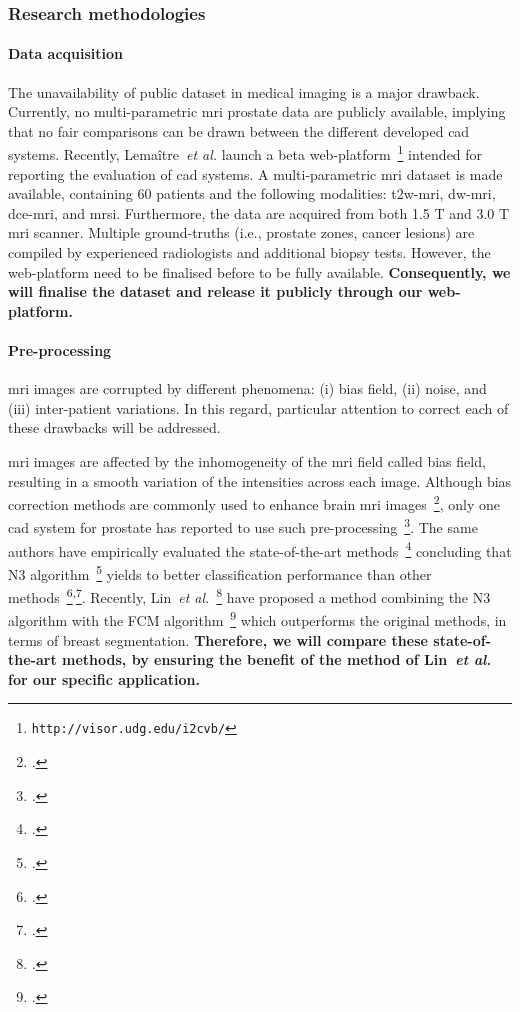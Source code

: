 \subsubsection{Research methodologies}
\label{sec:methodologies}

\paragraph{Data acquisition}

The unavailability of public dataset in medical imaging is a major drawback.
Currently, no multi-parametric \ac{mri} prostate data are publicly available, implying that no fair comparisons can be drawn between the different developed \ac{cad} systems.
Recently, Lema\^itre~\emph{et al.} launch a beta web-platform~\footnote{\texttt{http://visor.udg.edu/i2cvb/}} intended for reporting the evaluation of \ac{cad} systems.
A multi-parametric \ac{mri} dataset is made available, containing 60 patients and the following modalities: \ac{t2w}-\ac{mri}, \ac{dw}-\ac{mri}, \ac{dce}-\ac{mri}, and \ac{mrsi}.
Furthermore, the data are acquired from both 1.5 T and 3.0 T \ac{mri} scanner.
Multiple ground-truths (i.e., prostate zones, cancer lesions) are compiled by experienced radiologists and additional biopsy tests.
However, the web-platform need to be finalised before to be fully available.
\textbf{Consequently, we will finalise the dataset and release it publicly through our web-platform.}

\paragraph{Pre-processing}

\Ac{mri} images are corrupted by different phenomena: (i) bias field, (ii) noise, and (iii) inter-patient variations.
In this regard, particular attention to correct each of these drawbacks will be addressed.

\Ac{mri} images are affected by the inhomogeneity of the \ac{mri} field called bias field, resulting in a smooth variation of the intensities across each image.
Although bias correction methods are commonly used to enhance brain \ac{mri} images~\footcite{Vovk2007}, only one \ac{cad} system for prostate has reported to use such pre-processing~\footcite{Viswanath2009}.
The same authors have empirically evaluated the state-of-the-art methods~\footcite{viswanath2011empirical} concluding that N3 algorithm~\footcite{Sled1998} yields to better classification performance than other methods~\footcite{Styner2000}\textsuperscript{,}\footcite{Cohen2000}.
Recently, Lin~\emph{et al.}~\footcite{Lin2011} have proposed a method combining the N3 algorithm with the FCM algorithm~\footcite{Ahmed2002} which outperforms the original methods, in terms of breast segmentation.
\textbf{Therefore, we will compare these state-of-the-art methods, by ensuring the benefit of the method of Lin~\emph{et al.} for our specific application.}

